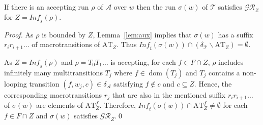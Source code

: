 \documentclass{llncs}
\newcommand{\mA}{\mathcal{A}}
\newcommand{\mGR}{\mathcal{GR}}
\newcommand{\mT}{\mathcal{T}}
\newcommand{\A}{_{\mA}}			\newcommand{\T}{_{\mT}}
\newcommand{\Inf}{\mathit{Inf\!}}
\newcommand{\AT}[1]{\mathrm{AT}_{\!#1}}
\DeclareMathOperator*{\dom}{{dom}}
\begin{document}
\begin{lemma}\label{lem:ag}
If there is an accepting run $\rho$ of $\mA$ over $w$ then the run 
$\sigma(w)$ of $\mT$ satisfies $\mathcal{GR}_{Z}$ for $Z=\Inf_s(\rho)$.
\end{lemma}
\begin{proof}
  As $\rho$ is bounded by $Z$, Lemma~\ref{lem:aux} implies that $\sigma(w)$
  has a suffix $r_ir_{i+1}\ldots$ of macrotransitions of $\AT{Z}$. Thus
  $\Inf_t(\sigma(w)) \cap (\delta\T \smallsetminus \AT{Z}) = \emptyset$.

  As $Z=\Inf_s(\rho)$ and $\rho=T_0T_1\ldots$ is accepting, for each $f\in F
  \cap Z$, $\rho$ includes infinitely many multitransitions $T_j$ where
  $f\in\dom(T_j)$ and $T_j$ contains a non-looping transition
  $(f,w_j,c)\in\delta\A$ satisfying $f\not\in c$ and $c\subseteq Z$. Hence,
  the corresponding macrotransitions $r_j$ that are also in the mentioned
  suffix $r_ir_{i+1}\ldots$ of $\sigma(w)$ are elements of $\AT{Z}^f$.
  Therefore, $\Inf_t(\sigma(w)) \cap \AT{Z}^f \neq \emptyset$ for each $f
  \in F \cap Z$ and $\sigma(w)$ satisfies $\mGR_Z$.\qed
\end{proof}
\end{document}
